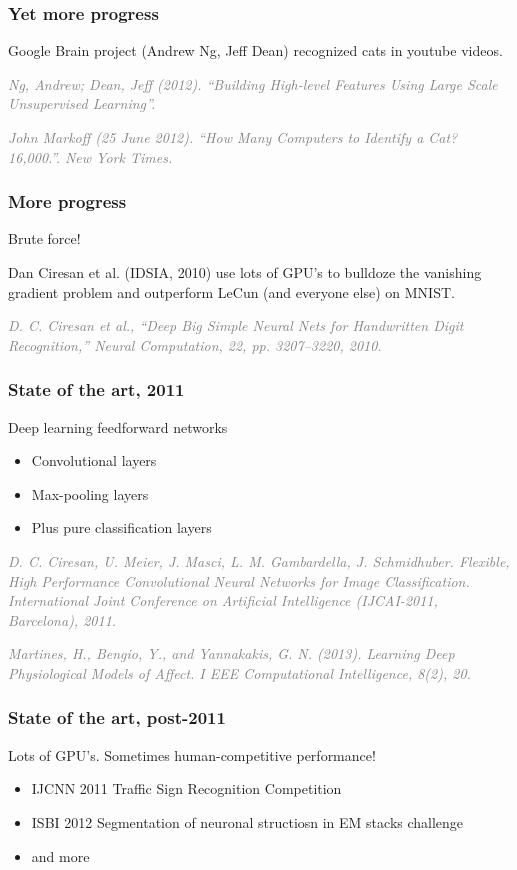 \documentclass{beamer}
\newcommand\smallgray[1]{\textcolor{gray}{\small\it #1}}
\newcommand\prevwork[1]{\smallgray{#1}}
\begin{document}
\begin{frame}
  \frametitle{Yet more progress}

  Google Brain project (Andrew Ng, Jeff Dean) recognized cats in
  youtube videos.

  \prevwork{Ng, Andrew; Dean, Jeff (2012). ``Building High-level
    Features Using Large Scale Unsupervised Learning''.}

  \prevwork{John Markoff (25 June 2012). ``How Many Computers to
    Identify a Cat? 16,000.''. New York Times.}

\end{frame}

\begin{frame}
  \frametitle{More progress}
  Brute force!

  Dan Ciresan et al. (IDSIA, 2010) use lots of GPU's to
  bulldoze the vanishing gradient problem and outperform LeCun (and
  everyone else) on MNIST.

  \prevwork{D. C. Ciresan et al., ``Deep Big Simple Neural Nets for
    Handwritten Digit Recognition,'' Neural Computation, 22,
    pp. 3207–3220, 2010.}
\end{frame}

\begin{frame}
  \frametitle{State of the art, 2011}

  Deep learning feedforward networks
  \begin{itemize}
  \item Convolutional layers
  \item Max-pooling layers
  \item Plus pure classification layers
  \end{itemize}

  \prevwork{D. C. Ciresan, U. Meier, J. Masci, L. M. Gambardella,
    J. Schmidhuber. Flexible, High Performance Convolutional Neural
    Networks for Image Classification. International Joint Conference
    on Artificial Intelligence (IJCAI-2011, Barcelona), 2011.}

  \prevwork{Martines, H., Bengio, Y., and Yannakakis,
    G. N. (2013). Learning Deep Physiological Models of Affect. I EEE
    Computational Intelligence, 8(2), 20.}
\end{frame}

\begin{frame}
  \frametitle{State of the art, post-2011}
  
  Lots of GPU's.  Sometimes human-competitive performance!
  \begin{itemize}
  \item IJCNN 2011 Traffic Sign Recognition Competition
  \item ISBI 2012 Segmentation of neuronal structiosn in EM stacks challenge
  \item and more
  \end{itemize}

\end{frame}
\end{document}
